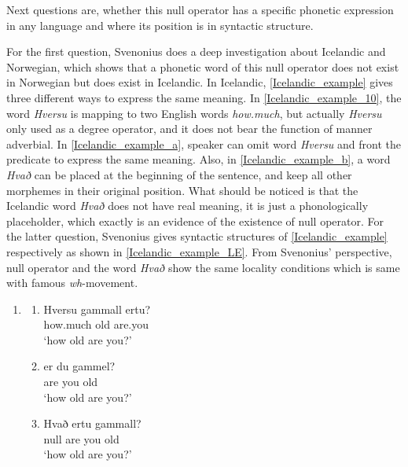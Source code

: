 \documentclass{ctexart}
\begin{document}
Next questions are, whether this null operator has a specific phonetic expression in any language and where its position is in syntactic structure. 

For the first question, Svenonius does a deep investigation about Icelandic and Norwegian, which shows that a phonetic word of this null operator does not exist in Norwegian but does exist in Icelandic. In Icelandic, \ref{Icelandic_example} gives three different ways to express the same meaning. In \ref{Icelandic_example_10}, the word \textit{Hversu} is mapping to two English words \textit{how.much}, but actually \textit{Hversu} only used as a degree operator, and it does not bear the function of manner adverbial. In \ref{Icelandic_example_a}, speaker can omit word \textit{Hversu} and front the predicate to express the same meaning. Also, in \ref{Icelandic_example_b}, a word \textit{Hvað} can be placed at the beginning of the sentence, and keep all other morphemes in their original position. What should be noticed is that the Icelandic word \textit{Hvað} does not have real meaning, it is just a phonologically placeholder, which exactly is an evidence of the existence of null operator. For the latter question, Svenonius gives syntactic structures of \ref{Icelandic_example} respectively as shown in \ref{Icelandic_example_LE}. From Svenonius' perspective, null operator and the word \textit{Hvað} show the same locality conditions which is same with famous \textit{wh}-movement. 

\begin{enumerate}
    \item \label{Icelandic_example}
    
    \begin{enumerate}
        \item \label{Icelandic_example_10}
        Hversu gammall ertu? \\
        how.much old are.you \\
        `how old are you?'

        \item \label{Icelandic_example_a}
        er du gammel? \\
        are you old \\
        `how old are you?'

        \item \label{Icelandic_example_b}
        Hvað ertu gammall? \\
        null are you old \\
        `how old are you?'

    \end{enumerate}   
    
\end{enumerate}
\end{document}
